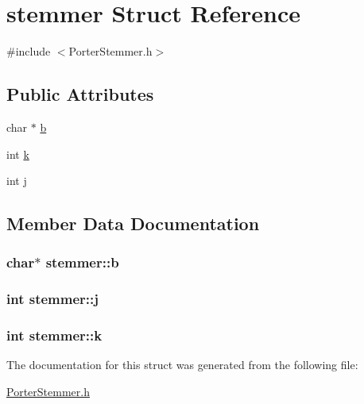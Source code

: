 \hypertarget{structstemmer}{}\section{stemmer Struct Reference}
\label{structstemmer}


{\ttfamily \#include $<$Porter\+Stemmer.\+h$>$}

\subsection*{Public Attributes}
\begin{DoxyCompactItemize}
\item 
char $\ast$ \hyperlink{structstemmer_a0ae99db94786418a0c4d85a2a15382a5}{b}
\item 
int \hyperlink{structstemmer_a587d5f8fd5c491688bc91e7d3b5e262e}{k}
\item 
int \hyperlink{structstemmer_a024d42a47e06bd5207e2494cbfefbf2f}{j}
\end{DoxyCompactItemize}


\subsection{Member Data Documentation}
\hypertarget{structstemmer_a0ae99db94786418a0c4d85a2a15382a5}{}
\subsubsection[{b}]{\setlength{\rightskip}{0pt plus 5cm}char$\ast$ stemmer\+::b}\label{structstemmer_a0ae99db94786418a0c4d85a2a15382a5}
\hypertarget{structstemmer_a024d42a47e06bd5207e2494cbfefbf2f}{}
\subsubsection[{j}]{\setlength{\rightskip}{0pt plus 5cm}int stemmer\+::j}\label{structstemmer_a024d42a47e06bd5207e2494cbfefbf2f}
\hypertarget{structstemmer_a587d5f8fd5c491688bc91e7d3b5e262e}{}
\subsubsection[{k}]{\setlength{\rightskip}{0pt plus 5cm}int stemmer\+::k}\label{structstemmer_a587d5f8fd5c491688bc91e7d3b5e262e}


The documentation for this struct was generated from the following file\+:\begin{DoxyCompactItemize}
\item 
\hyperlink{_porter_stemmer_8h}{Porter\+Stemmer.\+h}\end{DoxyCompactItemize}
